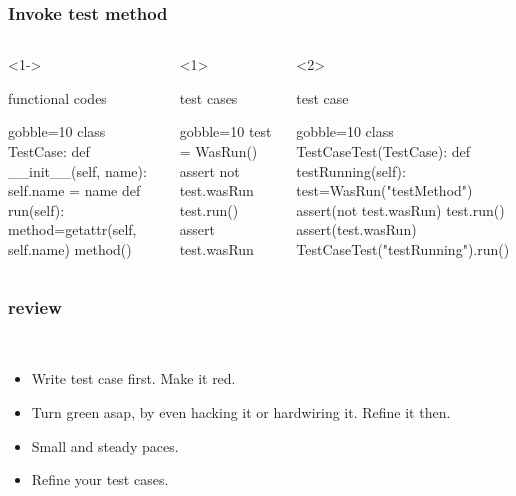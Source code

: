 \documentclass[lualatex]{beamer}
\begin{document}
\begin{frame}[fragile,t]
  \frametitle{Invoke test method}

  \begin{columns}[t]
    \small
    \begin{onlyenv}<1->
      \begin{block}{functional codes}
        \begin{pythoncode*}{gobble=10}
          class TestCase:
            def __init__(self, name):
              self.name = name
            def run(self):
              method=getattr(self, self.name)
              method()
        \end{pythoncode*}
      \end{block}
    \end{onlyenv}

    \begin{onlyenv}<1>
      \begin{block}{test cases}
        \begin{pythoncode*}{gobble=10}
          test = WasRun()
          assert not test.wasRun
          test.run()
          assert test.wasRun
        \end{pythoncode*}
      \end{block}
    \end{onlyenv}

    \begin{onlyenv}<2>
      \begin{block}{test case}
        \begin{pythoncode*}{gobble=10}
          class TestCaseTest(TestCase):
            def testRunning(self):
              test=WasRun("testMethod")
              assert(not test.wasRun)
              test.run()
              assert(test.wasRun)
          TestCaseTest("testRunning").run()
        \end{pythoncode*}
      \end{block}
    \end{onlyenv}
  \end{columns}
\end{frame}

\begin{frame}
  \frametitle{review}

  \begin{block}{~}
    \begin{itemize}
    \item 
      Write test case first.
      Make it red.
    \item 
      Turn green asap, by even hacking it or hardwiring it.
      Refine it then.
    \item 
      Small and steady paces.
    \item 
      Refine your test cases.
    \end{itemize}
  \end{block}
\end{frame}
\end{document}
